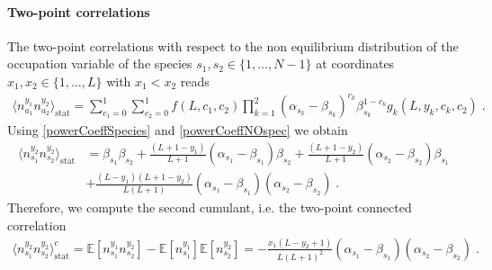\documentclass[10pt]{article}
\numberwithin{equation}{section}
\numberwithin{equation}{subsection}
\newcommand{\dt}{\;.}
\begin{document}
\paragraph{Two-point correlations}
The two-point correlations with respect to the non equilibrium distribution of the occupation variable of the species $s_{1},s_{2}\in \{1,\ldots,N-1\}$ at coordinates $x_{1},x_{2}\in \{1,\ldots,L\}$ with $x_{1}< x_{2}$ reads 
\begin{equation}
	\begin{split}
		\langle n_{a_{1}}^{y_{1}}n_{a_{2}}^{y_{2}}\rangle_{\text{stat}}= \sum_{c_{1}=0}^{1}\sum_{c_{2}=0}^{1}f(L,c_{1},c_{2})\prod_{k=1}^{2}(\alpha_{s_{k}}-\beta_{s_{k}})^{c_{k}}\beta_{s_{k}}^{1-c_{k}}g_{k}(L,y_{k},c_{k},c_{2})\dt
	\end{split}
\end{equation}
Using \eqref{powerCoeffSpecies} and \eqref{powerCoeffNOspec} we obtain 
\begin{equation}
	\begin{split}
		\langle n_{s_{1}}^{y_{2}} n_{s_{2}}^{y_{2}}\rangle_{\text{stat}}&=\beta_{s_{1}}\beta_{s_{2}}+\frac{(L+1-y_{1})}{L+1}(\alpha_{s_{1}}-\beta_{s_{1}})\beta_{s_{2}}+\frac{(L+1-y_{2})}{L+1}(\alpha_{s_{2}}-\beta_{s_{2}})\beta_{s_{1}}\\&+\frac{(L-y_{1})(L+1-y_{2})}{L(L+1)}(\alpha_{s_{1}}-\beta_{s_{1}})(\alpha_{s_{2}}-\beta_{s_{2}})\dt
	\end{split}
\end{equation}
Therefore, we compute the second cumulant, i.e. the two-point connected correlation
\begin{equation}\label{two-pts-corr}
	\begin{split}
		\langle n_{s_{1}}^{y_{2}} n_{s_{2}}^{y_{2}}\rangle_{\text{stat}}^{c}=\mathbb{E}[n_{s_{1}}^{y_{1}}n_{s_{2}}^{y_{2}}]-\mathbb{E}[n_{s_{1}}^{y_{1}}]\mathbb{E}[n_{s_{2}}^{y_{2}}]=-\frac{x_{1}(L-y_{2}+1)}{L(L+1)^{2}}\left(\alpha_{s_{1}}-\beta_{s_{1}}\right)\left(\alpha_{s_{2}}-\beta_{s_{2}}\right)\dt
	\end{split}
\end{equation}
\end{document}
